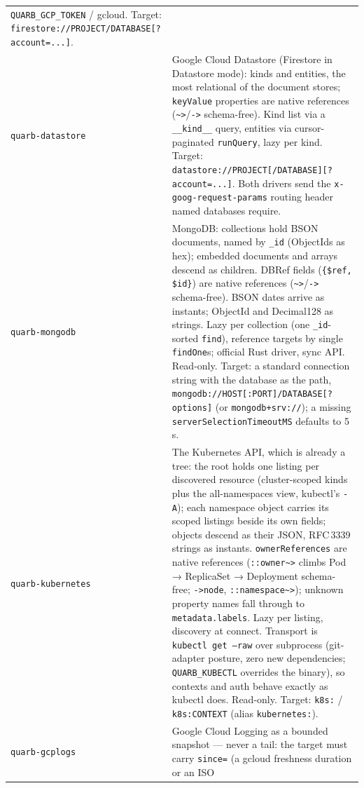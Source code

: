 \documentclass{report}
\begin{document}
\begin{xltabular}{\textwidth}{l X}
  \texttt{QUARB\_GCP\_TOKEN} / gcloud. Target:
  \texttt{firestore://PROJECT/DATABASE[?account=...]}. \\
\texttt{quarb-datastore} & Google Cloud Datastore (Firestore in
  Datastore mode): kinds and entities, the most relational of the
  document stores; \texttt{keyValue} properties are native
  references (\texttt{\textasciitilde>}/\texttt{->} schema-free).
  Kind list via a \texttt{\_\_kind\_\_} query, entities via
  cursor-paginated \texttt{runQuery}, lazy per kind. Target:
  \texttt{datastore://PROJECT[/DATABASE][?account=...]}. Both
  drivers send the \texttt{x-goog-request-params} routing header
  named databases require. \\
\texttt{quarb-mongodb} & MongoDB: collections hold BSON
  documents, named by \texttt{\_id} (ObjectIds as hex); embedded
  documents and arrays descend as children. DBRef fields
  (\texttt{\{\$ref, \$id\}}) are native references
  (\texttt{\textasciitilde>}/\texttt{->} schema-free). BSON dates
  arrive as instants; ObjectId and Decimal128 as strings. Lazy
  per collection (one \texttt{\_id}-sorted \texttt{find}),
  reference targets by single \texttt{findOne}s; official Rust
  driver, sync API. Read-only. Target: a standard connection
  string with the database as the path,
  \texttt{mongodb://HOST[:PORT]/DATABASE[?options]} (or
  \texttt{mongodb+srv://}); a missing
  \texttt{serverSelectionTimeoutMS} defaults to 5\,s. \\
\texttt{quarb-kubernetes} & The Kubernetes API, which is
  already a tree: the root holds one listing per discovered
  resource (cluster-scoped kinds plus the all-namespaces view,
  kubectl's \texttt{-A}); each namespace object carries its
  scoped listings beside its own fields; objects descend as
  their JSON, RFC\,3339 strings as instants.
  \texttt{ownerReferences} are native references
  (\texttt{::owner\textasciitilde>} climbs Pod → ReplicaSet →
  Deployment schema-free; \texttt{->node},
  \texttt{::namespace\textasciitilde>}); unknown property names
  fall through to \texttt{metadata.labels}. Lazy per listing,
  discovery at connect. Transport is \texttt{kubectl get --raw}
  over subprocess (git-adapter posture, zero new dependencies;
  \texttt{QUARB\_KUBECTL} overrides the binary), so contexts and
  auth behave exactly as kubectl does. Read-only. Target:
  \texttt{k8s:} / \texttt{k8s:CONTEXT} (alias
  \texttt{kubernetes:}). \\
\texttt{quarb-gcplogs} & Google Cloud Logging as a bounded
  snapshot — never a tail: the target must carry
  \texttt{since=} (a gcloud freshness duration or an ISO

\end{xltabular}
\end{document}
